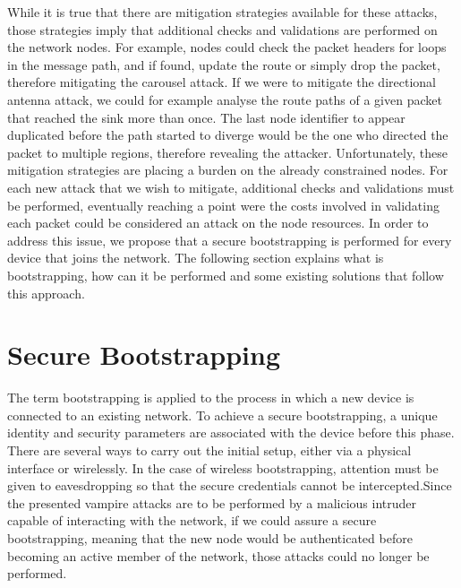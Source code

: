 \documentclass{sig-alternate-05-2015}
\begin{document}
While it is true that there are mitigation strategies available for these attacks, those strategies imply that additional checks and validations are performed on the network nodes. For example, nodes could check the packet headers for loops in the message path, and if found, update the route or simply drop the packet, therefore mitigating the carousel attack. If we were to mitigate the directional antenna attack, we could for example analyse the route paths of a given packet that reached the sink more than once. The last node identifier to appear duplicated before the path started to diverge would be the one who directed the packet to multiple regions, therefore revealing the attacker. Unfortunately, these mitigation strategies are placing a burden on the already constrained nodes. For each new attack that we wish to mitigate, additional checks and validations must be performed, eventually reaching a point were the costs involved in validating each packet could be considered an attack on the node resources. In order to address this issue, we propose that a secure bootstrapping is performed for every device that joins the network. The following section explains what is bootstrapping, how can it be performed and some existing solutions that follow this approach.

\section{Secure Bootstrapping}
\label{sec:secure_bootstrapping}
The term bootstrapping is applied to the process in which a new device is connected to an existing network. To achieve a secure bootstrapping, a unique identity and security parameters are associated with the device before this phase. There are several ways to carry out the initial setup, either via a physical interface or wirelessly. In the case of wireless bootstrapping, attention must be given to eavesdropping so that the secure credentials cannot be intercepted.Since the presented vampire attacks are to be performed by a malicious intruder capable of interacting with the network, if we could assure a secure bootstrapping, meaning that the new node would be authenticated before becoming an active member of the network, those attacks could no longer be performed.
\end{document}
